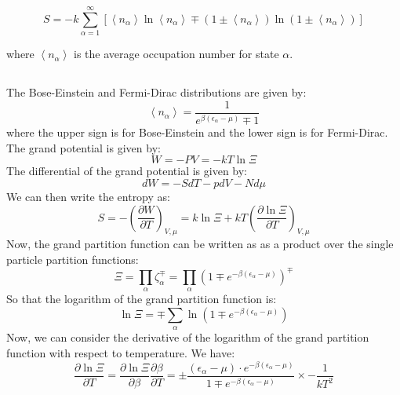 \documentclass[12pt]{article}
\begin{document}
$$
S=-k \sum_{\alpha=1}^{\infty}\left[\left\langle n_{\alpha}\right\rangle \ln \left\langle n_{\alpha}\right\rangle \mp\left(1 \pm\left\langle n_{\alpha}\right\rangle\right) \ln \left(1 \pm\left\langle n_{\alpha}\right\rangle\right)\right]
$$

where $\left\langle n_{\alpha}\right\rangle$ is the average occupation number for state $\alpha$.
\subsection{}
The Bose-Einstein and Fermi-Dirac distributions are given by:
\begin{equation}
  \left\langle n_{\alpha}\right\rangle=\frac{1}{e^{\beta\left(\epsilon_{\alpha}-\mu\right)}\mp 1}
\end{equation}
where the upper sign is for Bose-Einstein and the lower sign is for Fermi-Dirac.
The grand potential is given by:
\begin{equation}
  W = -PV = -kT\ln \Xi
\end{equation}
The differential of the grand potential is given by:
\begin{equation}
  dW = -SdT - pdV - N d\mu
\end{equation}
We can then write the entropy as:
\begin{equation}
  S = -\left(\frac{\partial W}{\partial T}\right)_{V,\mu} = k \ln \Xi + kT\left(\frac{\partial \ln \Xi}{\partial T}\right)_{V,\mu}
\end{equation}
Now, the grand partition function can be written as as a product over the single particle partition functions:
\begin{equation}
  \Xi = \prod_{\alpha} \zeta_{\alpha}^{\mp} = \prod_{\alpha} \left(1\mp e^{-\beta\left(\epsilon_{\alpha}-\mu\right)}\right)^{\mp}
\end{equation}
So that the logarithm of the grand partition function is:
\begin{equation}
  \ln \Xi = \mp \sum_{\alpha} \ln \left(1\mp e^{-\beta\left(\epsilon_{\alpha}-\mu\right)}\right)
\end{equation}
Now, we can consider the derivative of the logarithm of the grand partition function with respect to temperature. We have:
\begin{equation}
  \frac{\partial \ln \Xi}{\partial T} = \frac{\partial \ln \Xi}{\partial \beta}\frac{\partial \beta}{\partial T} = \pm\frac{(\epsilon_{\alpha} - \mu) \cdot e^{-\beta(\epsilon_{\alpha} - \mu)}}{1 \mp e^{-\beta(\epsilon_{\alpha} - \mu)}} \times -\frac{1}{kT^2}
\end{equation}
\end{document}
